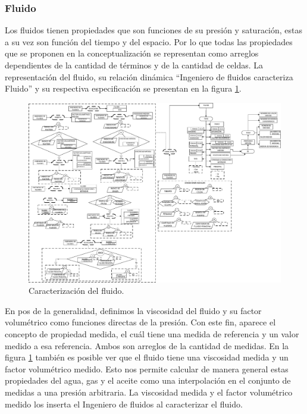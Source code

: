 \subsubsection{Fluido}\label{sec:PS_Phase}

Los fluidos tienen propiedades que son funciones de su presión y saturación, estas a su vez son función del tiempo y del espacio. Por lo que todas las propiedades que se proponen en la conceptualización se representan como arreglos dependientes de la cantidad de términos y de la cantidad de celdas. La representación del fluido, su relación dinámica ``Ingeniero de fluidos caracteriza Fluido'' y su respectiva especificación se presentan en la figura \ref{fig:Fluid}.\\

\begin{figure}[h]
	\centering%
	\includegraphics[width=0.9\linewidth]{Kap4/Fluid.pdf}%
	\caption{Caracterización del fluido.} \label{fig:Fluid}
\end{figure}

En pos de la generalidad, definimos la viscosidad del fluido y su factor volumétrico como funciones directas de la presión. Con este fin, aparece el concepto de propiedad medida, el cuál tiene una medida de referencia y un valor medido a esa referencia. Ambos son arreglos de la cantidad de medidas. En la figura \ref{fig:Fluid} también es posible ver que el fluido tiene una viscosidad medida y un factor volumétrico medido. Esto nos permite calcular de manera general estas propiedades del agua, gas y el aceite como una interpolación en el conjunto de medidas a una presión arbitraria. La viscosidad medida y el factor volumétrico medido los inserta el Ingeniero de fluidos al caracterizar el fluido. \\

